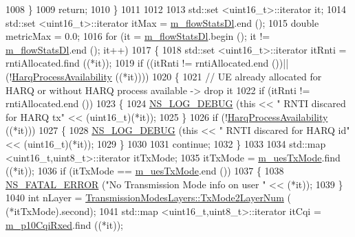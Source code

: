 \begin{DoxyCode}
1008         \}
1009       \textcolor{keywordflow}{return};
1010     \}
1011 
1012 
1013   std::set <uint16\_t>::iterator it;
1014   std::set <uint16\_t>::iterator itMax = \hyperlink{classns3_1_1TdMtFfMacScheduler_abec4dc7fc4bc238696409e0878147dfb}{m\_flowStatsDl}.end ();
1015   \textcolor{keywordtype}{double} metricMax = 0.0;
1016   \textcolor{keywordflow}{for} (it = \hyperlink{classns3_1_1TdMtFfMacScheduler_abec4dc7fc4bc238696409e0878147dfb}{m\_flowStatsDl}.begin (); it != \hyperlink{classns3_1_1TdMtFfMacScheduler_abec4dc7fc4bc238696409e0878147dfb}{m\_flowStatsDl}.end (); it++)
1017     \{
1018       std::set <uint16\_t>::iterator itRnti = rntiAllocated.find ((*it));
1019       \textcolor{keywordflow}{if} ((itRnti != rntiAllocated.end ())||(!\hyperlink{classns3_1_1TdMtFfMacScheduler_a5c903c7ba548d0ce35820d0edcdbb470}{HarqProcessAvailability} ((*it))))
1020         \{
1021           \textcolor{comment}{// UE already allocated for HARQ or without HARQ process available -> drop it}
1022           \textcolor{keywordflow}{if} (itRnti != rntiAllocated.end ())
1023           \{
1024             \hyperlink{group__logging_ga413f1886406d49f59a6a0a89b77b4d0a}{NS\_LOG\_DEBUG} (\textcolor{keyword}{this} << \textcolor{stringliteral}{" RNTI discared for HARQ tx"} << (uint16\_t)(*it));
1025           \}
1026           \textcolor{keywordflow}{if} (!\hyperlink{classns3_1_1TdMtFfMacScheduler_a5c903c7ba548d0ce35820d0edcdbb470}{HarqProcessAvailability} ((*it)))
1027           \{
1028             \hyperlink{group__logging_ga413f1886406d49f59a6a0a89b77b4d0a}{NS\_LOG\_DEBUG} (\textcolor{keyword}{this} << \textcolor{stringliteral}{" RNTI discared for HARQ id"} << (uint16\_t)(*it));
1029           \}
1030 
1031           \textcolor{keywordflow}{continue};
1032         \}
1033 
1034      std::map <uint16\_t,uint8\_t>::iterator itTxMode;
1035      itTxMode = \hyperlink{classns3_1_1TdMtFfMacScheduler_a4e8f3faab7130fbcbfa6df2bf09a7a9a}{m\_uesTxMode}.find ((*it));
1036      \textcolor{keywordflow}{if} (itTxMode == \hyperlink{classns3_1_1TdMtFfMacScheduler_a4e8f3faab7130fbcbfa6df2bf09a7a9a}{m\_uesTxMode}.end ())
1037        \{
1038          \hyperlink{group__fatal_ga5131d5e3f75d7d4cbfd706ac456fdc85}{NS\_FATAL\_ERROR} (\textcolor{stringliteral}{"No Transmission Mode info on user "} << (*it));
1039        \}
1040      \textcolor{keywordtype}{int} nLayer = \hyperlink{classns3_1_1TransmissionModesLayers_a31f608b7bfaa77440fe4cb85ad035329}{TransmissionModesLayers::TxMode2LayerNum} (
      (*itTxMode).second);
1041      std::map <uint16\_t,uint8\_t>::iterator itCqi = \hyperlink{classns3_1_1TdMtFfMacScheduler_a4b524ffee6b93f0534a603937fd30cb1}{m\_p10CqiRxed}.find ((*it));

\end{DoxyCode}

